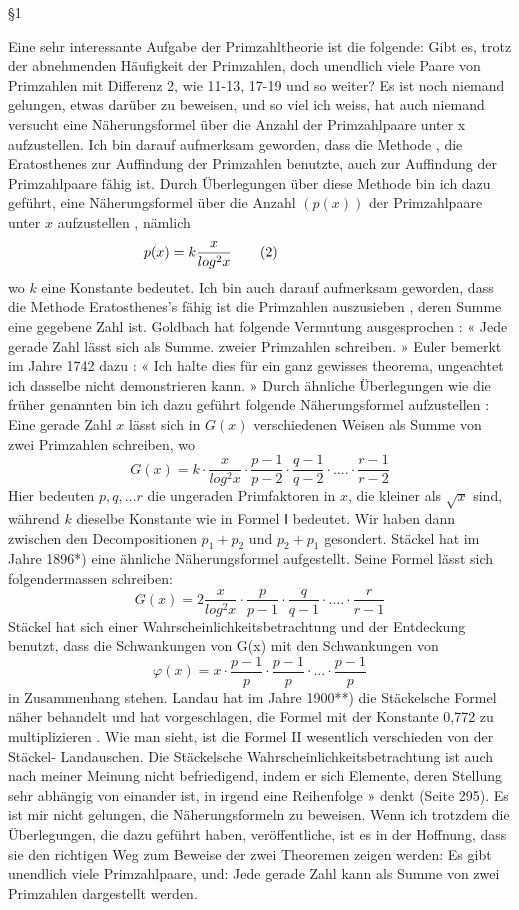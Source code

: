 \documentclass{article}
\begin{document}
§1

Eine sehr interessante Aufgabe der Primzahltheorie ist die folgende: Gibt es, trotz der abnehmenden Häufigkeit der Primzahlen, doch unendlich viele Paare von Primzahlen mit Differenz 2, wie 11-13, 17-19 und so weiter?
Es ist noch niemand gelungen, etwas darüber zu beweisen, und so viel ich weiss, hat auch niemand versucht eine Näherungsformel über die Anzahl der Primzahlpaare unter x aufzustellen.
Ich bin darauf aufmerksam geworden, dass die Methode , die Eratosthenes zur Auffindung der Primzahlen benutzte, auch zur Auffindung der Primzahlpaare fähig ist.
Durch Überlegungen über diese Methode bin ich dazu geführt, eine Näherungsformel über die Anzahl $(p(x))$ der Primzahlpaare unter $x$ aufzustellen , nämlich$$ p(x)=k\frac{x}{log^2x}\tag2\hspace{7em}$$wo $k$ eine Konstante bedeutet.
Ich bin auch darauf aufmerksam geworden, dass die Methode Eratosthenes's fähig ist die Primzahlen auszusieben , deren Summe eine gegebene Zahl ist. Goldbach hat folgende Vermutung ausgesprochen : « Jede gerade Zahl lässt sich als Summe. zweier Primzahlen schreiben. » Euler bemerkt im Jahre 1742 dazu : « Ich halte dies für ein ganz gewisses theorema, ungeachtet ich dasselbe nicht demonstrieren kann. »
Durch ähnliche Überlegungen wie die früher genannten bin ich dazu geführt folgende Näherungsformel aufzustellen :
Eine gerade Zahl $x$ lässt sich in $G(x)$ verschiedenen Weisen als Summe von zwei Primzahlen schreiben, wo$$G(x)=k\cdot\frac{x}{log^2x}\cdot\frac{p-1}{p-2}\cdot\frac{q-1}{q-2}\cdot....\cdot\frac{r-1}{r-2}$$
Hier bedeuten $p, q,...r$ die ungeraden Primfaktoren in $x$, die kleiner als $\sqrt{x}$ sind, während $k$ dieselbe Konstante wie in Formel $Ⅰ$ bedeutet. Wir haben dann zwischen den Decompositionen $p_1+p_2$ und $p_2 +p_1$ gesondert.
Stäckel hat im Jahre 1896*) eine ähnliche Näherungsformel aufgestellt. Seine Formel lässt sich folgendermassen schreiben:$$G(x)=2\frac{x}{log^2x}\cdot\frac{p}{p-1}\cdot\frac{q}{q-1}\cdot....\cdot\frac{r}{r-1}$$
Stäckel hat sich einer Wahrscheinlichkeitsbetrachtung und der Entdeckung benutzt, dass die Schwankungen von G(x) mit den Schwankungen von$$\varphi(x)=x\cdot\frac{p-1}{p}\cdot\frac{p-1}{p}\cdot...\cdot\frac{p-1}{p}$$
in Zusammenhang stehen.
Landau hat im Jahre 1900**) die Stäckelsche Formel näher behandelt und hat vorgeschlagen, die Formel mit der Konstante 0,772 zu multiplizieren . Wie man sieht, ist die Formel II wesentlich verschieden von der Stäckel- Landauschen.
Die Stäckelsche Wahrscheinlichkeitsbetrachtung ist auch nach meiner Meinung nicht befriedigend, indem er sich Elemente, deren Stellung sehr abhängig von einander ist, in irgend eine Reihenfolge » denkt (Seite 295).
Es ist mir nicht gelungen, die Näherungsformeln zu beweisen. Wenn ich trotzdem die Überlegungen, die dazu geführt haben, veröffentliche, ist es in der Hoffnung, dass sie den richtigen Weg zum Beweise der zwei Theoremen zeigen werden: Es gibt unendlich viele Primzahlpaare, und: Jede gerade Zahl kann als Summe von zwei Primzahlen dargestellt werden.
\end{document}
